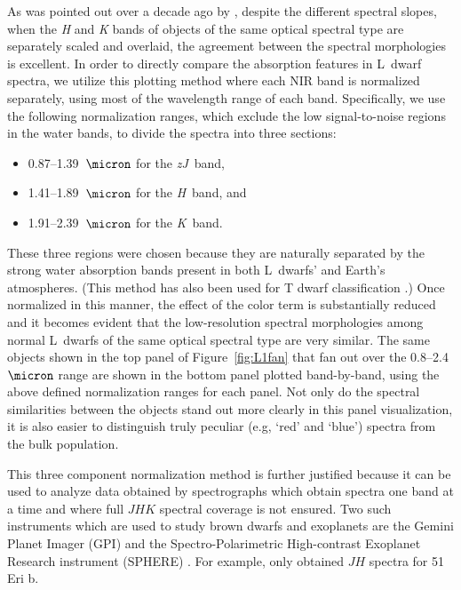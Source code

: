 \documentclass[modern,trackchanges]{aastex61}
\begin{document}
As was pointed out over a decade ago by \citet{Leggett:2003tm}, despite the different spectral slopes, when the \emph{H} and \emph{K} bands of objects of the same optical spectral type are separately scaled and overlaid, the agreement between the spectral morphologies is excellent.
In order to directly compare the absorption features in L~dwarf spectra, we utilize this plotting method where each NIR band is normalized separately, using most of the wavelength range of each band.
Specifically, we use the following normalization ranges, which exclude the low signal-to-noise regions in the water bands, to divide the spectra into three sections:
\begin{itemize}
\item 0.87--1.39~$\micron$ for the \emph{zJ}~band,
\item 1.41--1.89~$\micron$ for the \emph{H}~band, and
\item 1.91--2.39~$\micron$ for the \emph{K}~band.
\end{itemize}
These three regions were chosen because they are naturally separated by the strong water absorption bands present in both L~dwarfs' and Earth's atmospheres.
(This method has also been used for T dwarf classification \cite{Burgasser06}.)
Once normalized in this manner, the effect of the color term is substantially reduced and it becomes evident that the low-resolution spectral morphologies among normal L~dwarfs of the same optical spectral type are very similar.
The same objects shown in the top panel of Figure~\ref{fig:L1fan} that fan out over the 0.8--2.4~$\micron$ range are shown in the bottom panel plotted band-by-band, using the above defined normalization ranges for each panel.
Not only do the spectral similarities between the objects stand out more clearly in this panel visualization, it is also easier to distinguish truly peculiar (e.g, `red' and `blue') spectra from the bulk population.

This three component normalization method is further justified because it can be used to analyze data obtained by spectrographs which obtain spectra one band at a time and where full $JHK$ spectral coverage is not ensured.
Two such instruments which are used to study brown dwarfs and exoplanets are the Gemini Planet Imager (GPI) and the Spectro-Polarimetric High-contrast Exoplanet Research instrument (SPHERE) \citep{Beuzit:2008gt,Macintosh:2014js}.
For example, \citet{Macintosh:2015ew} only obtained $JH$ spectra for 51 Eri b.
\end{document}
